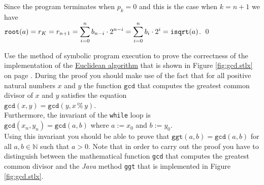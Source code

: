 Since the program terminates when $p_k = 0$ and this is the case when  $k=n+1$ we have
\\[0.2cm]
\hspace*{1.3cm}
$\displaystyle \mathtt{root}(a) = r_K = r_{n+1} = \sum\limits_{i=0}^{n} b_{n-i} \cdot 2^{n-i} = \sum\limits_{i=0}^{n} b_i \cdot 2^i = \mathtt{isqrt}(a)$. \qed

\exerciseEng
Use the method of symbolic program execution to prove the correctness of the implementation of the
\href{https://en.wikipedia.org/wiki/Euclidean_algorithm}{Euclidean algorithm} that is shown in Figure
\ref{fig:gcd.stlx} on page \pageref{fig:gcd.stlx}.  During the proof 
you should make use of the fact that for all positive natural numbers $x$ and $y$ the function $\mathtt{gcd}$
that computes the greatest common divisor of $x$ and $y$ satisfies the equation
\\[0.2cm]
\hspace*{1.3cm}
$\mathtt{gcd}(x, y) = \mathtt{gcd}(y, x \,\mathtt{\%}\, y)$.
\\[0.2cm]
Furthermore, the invariant of the \texttt{while} loop is
\\[0.2cm]
\hspace*{1.3cm}
$\mathtt{gcd}(x_n, y_n) = \mathtt{gcd}(a, b)$ \quad where $a := x_0$ and $b := y_0$.
\\[0.2cm]
Using this invariant you should be able to prove that $\mathtt{ggt}(a, b) = \mathtt{gcd}(a, b)$ for all
$a, b \in \mathbb{N}$ such that $a > 0$.  Note that in order to carry out the proof you have to distinguish
between the mathematical function \texttt{gcd} that computes the greatest common divisor and the \textsl{Java}
method \texttt{ggt} that is implemented in Figure \ref{fig:gcd.stlx}.
\eox

